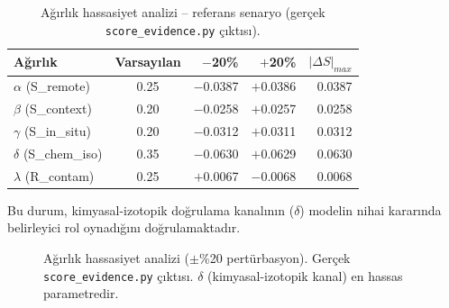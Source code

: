 \documentclass[12pt,a4paper]{article}
\begin{document}
\begin{table}[ht]
\centering
\caption{Ağırlık hassasiyet analizi -- referans senaryo (gerçek \texttt{score\_evidence.py} çıktısı).}
\label{tab:sensitivity}
\begin{tabular}{lcrrr}
\toprule
\textbf{Ağırlık} & \textbf{Varsayılan} & \textbf{$-$20\%} & \textbf{$+$20\%} & $|\Delta S|_{max}$ \\
\midrule
$\alpha$ (S\_remote)   & 0.25 & $-$0.0387 & $+$0.0386 & 0.0387 \\
$\beta$ (S\_context)   & 0.20 & $-$0.0258 & $+$0.0257 & 0.0258 \\
$\gamma$ (S\_in\_situ) & 0.20 & $-$0.0312 & $+$0.0311 & 0.0312 \\
$\delta$ (S\_chem\_iso)& 0.35 & $-$0.0630 & $+$0.0629 & 0.0630 \\
$\lambda$ (R\_contam)  & 0.25 & $+$0.0067 & $-$0.0068 & 0.0068 \\
\bottomrule
\end{tabular}
\end{table}

Bu durum, kimyasal-izotopik doğrulama kanalının ($\delta$) modelin nihai kararında belirleyici rol oynadığını doğrulamaktadır.

\begin{figure}[ht]
\centering
{}
\caption{Ağırlık hassasiyet analizi ($\pm$\%20 pertürbasyon). Gerçek \texttt{score\_evidence.py} çıktısı. $\delta$ (kimyasal-izotopik kanal) en hassas parametredir.}
\label{fig:sensitivity}
\end{figure}
\end{document}
